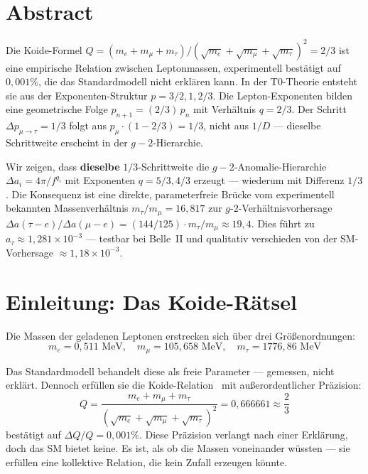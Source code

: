 \section*{Abstract}
	Die Koide-Formel $Q = (m_e + m_\mu + m_\tau)/(\sqrt{m_e} + \sqrt{m_\mu} + \sqrt{m_\tau})^2 = 2/3$ ist eine empirische Relation zwischen Leptonmassen, experimentell bestätigt auf $0{,}001\%$, die das Standardmodell nicht erklären kann. In der T0-Theorie entsteht sie aus der Exponenten-Struktur $p = 3/2, 1, 2/3$. Die Lepton-Exponenten bilden eine geometrische Folge $p_{n+1} = (2/3)\,p_n$ mit Verhältnis $q = 2/3$. Der Schritt $\Delta p_{\mu\to\tau} = 1/3$ folgt aus $p_\mu \cdot (1 - 2/3) = 1/3$, nicht aus $1/D$ — dieselbe Schrittweite erscheint in der $g-2$-Hierarchie.
	
	Wir zeigen, dass \textbf{dieselbe} $1/3$-Schrittweite die $g-2$-Anomalie-Hierarchie $\Delta a_i = 4\pi/f^{q_i}$ mit Exponenten $q = 5/3, 4/3$ erzeugt — wiederum mit Differenz $1/3$. Die Konsequenz ist eine direkte, parameterfreie Brücke vom experimentell bekannten Massenverhältnis $m_\tau/m_\mu = 16{,}817$ zur $g$-$2$-Verhältnisvorhersage $\Delta a(\tau{-}e)/\Delta a(\mu{-}e) = (144/125) \cdot m_\tau/m_\mu \approx 19{,}4$. Dies führt zu $a_\tau \approx 1{,}281 \times 10^{-3}$ — testbar bei Belle~II und qualitativ verschieden von der SM-Vorhersage $\approx 1{,}18 \times 10^{-3}$.

\section{Einleitung: Das Koide-Rätsel}

Die Massen der geladenen Leptonen erstrecken sich über drei Größenordnungen:
\begin{equation}
	m_e = 0{,}511 \text{ MeV}, \quad m_\mu = 105{,}658 \text{ MeV}, \quad m_\tau = 1776{,}86 \text{ MeV}
\end{equation}

Das Standardmodell behandelt diese als freie Parameter — gemessen, nicht erklärt. Dennoch erfüllen sie die Koide-Relation~\cite{Koide1983} mit außerordentlicher Präzision:
\begin{equation}
	\boxed{Q = \frac{m_e + m_\mu + m_\tau}{\left(\sqrt{m_e} + \sqrt{m_\mu} + \sqrt{m_\tau}\right)^2} = 0{,}666661 \approx \frac{2}{3}}
	\label{eq:koide}
\end{equation}
bestätigt auf $\Delta Q/Q = 0{,}001\%$. Diese Präzision verlangt nach einer Erklärung, doch das SM bietet keine. Es ist, als ob die Massen voneinander wüssten — sie erfüllen eine kollektive Relation, die kein Zufall erzeugen könnte.


